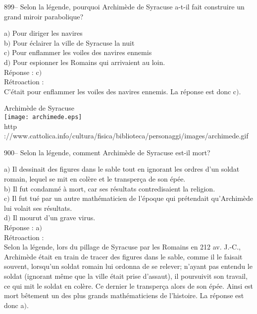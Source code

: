 ﻿\documentclass[letterpaper, 12pt]{article}
\begin{document}
899-- Selon la l\'egende, pourquoi Archim\`ede de Syracuse a-t-il
fait construire un grand miroir parabolique?

a$)$ Pour diriger les navires \\
b$)$ Pour \'eclairer la ville de Syracuse la nuit \\
c$)$ Pour enflammer les voiles des navires ennemis \\
d$)$ Pour espionner les Romains qui arrivaient au loin.\\

R\'eponse : c$)$\\

R\'etroaction : \\
C'\'etait pour enflammer les voiles des navires ennemis. La r\'eponse est
donc c$)$.\\

        \begin{center}
        Archim\`ede de Syracuse\\
    \texttt{[image: archimede.eps]}\\
        {\footnotesize http
://www.cattolica.info/cultura/fisica/biblioteca/personaggi/images/archimede.gif}
    \end{center}

900-- Selon la l\'egende, comment Archim\`ede de Syracuse est-il
mort?

a$)$ Il dessinait des figures dans le sable tout en ignorant les ordres d'un
soldat romain, lequel se mit en col\`ere
et le transper\c ca de son \'ep\'ee. \\
b$)$ Il fut condamn\'e \`a mort, car ses r\'esultats contredisaient la
religion. \\
c$)$ Il fut tu\'e par un autre math\'ematicien de l'\'epoque qui
pr\'etendait qu'Archim\`ede lui volait ses r\'esultats. \\
d$)$ Il mourut d'un grave virus.\\

R\'eponse : a$)$\\

R\'etroaction :\\
Selon la l\'egende, lors du pillage de Syracuse par les Romains en
212 av. J.-C., Archim\`ede \'etait en train de tracer des figures
dans le sable, comme il le faisait souvent, lorsqu'un soldat romain
lui ordonna de se relever; n'ayant pas entendu le soldat (ignorant
m\^eme que la ville \'etait prise d'assaut), il poursuivit son
travail, ce qui mit le soldat en col\`ere. Ce dernier le transper\c
ca alors de son \'ep\'ee. Ainsi est mort
b\^etement un des plus grands math\'ematiciens de l'histoire. La r\'eponse
est donc a$)$.\\
\end{document}
